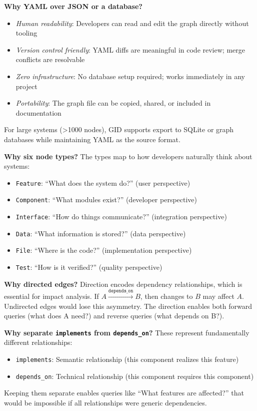 \documentclass[11pt,a4paper]{article}
\begin{document}
\textbf{Why YAML over JSON or a database?}
\begin{itemize}[noitemsep]
    \item \emph{Human readability}: Developers can read and edit the graph directly without tooling
    \item \emph{Version control friendly}: YAML diffs are meaningful in code review; merge conflicts are resolvable
    \item \emph{Zero infrastructure}: No database setup required; works immediately in any project
    \item \emph{Portability}: The graph file can be copied, shared, or included in documentation
\end{itemize}
For large systems (>1000 nodes), GID supports export to SQLite or graph databases while maintaining YAML as the source format.

\textbf{Why six node types?}
The types map to how developers naturally think about systems:
\begin{itemize}[noitemsep]
    \item \texttt{Feature}: ``What does the system do?'' (user perspective)
    \item \texttt{Component}: ``What modules exist?'' (developer perspective)
    \item \texttt{Interface}: ``How do things communicate?'' (integration perspective)
    \item \texttt{Data}: ``What information is stored?'' (data perspective)
    \item \texttt{File}: ``Where is the code?'' (implementation perspective)
    \item \texttt{Test}: ``How is it verified?'' (quality perspective)
\end{itemize}

\textbf{Why directed edges?}
Direction encodes dependency relationships, which is essential for impact analysis. If $A \xrightarrow{\texttt{depends\_on}} B$, then changes to $B$ may affect $A$. Undirected edges would lose this asymmetry. The direction enables both forward queries (what does A need?) and reverse queries (what depends on B?).

\textbf{Why separate \texttt{implements} from \texttt{depends\_on}?}
These represent fundamentally different relationships:
\begin{itemize}[noitemsep]
    \item \texttt{implements}: Semantic relationship (this component realizes this feature)
    \item \texttt{depends\_on}: Technical relationship (this component requires this component)
\end{itemize}
Keeping them separate enables queries like ``What features are affected?'' that would be impossible if all relationships were generic dependencies.
\end{document}
